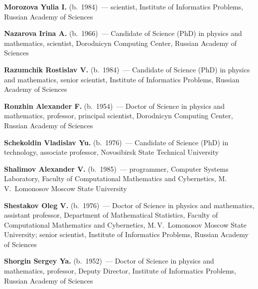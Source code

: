 \begin{multicols}{2}
\vspace*{4pt}

\noindent
\textbf{Morozova Yulia I.} (b.\ 1984)~--- scientist, Institute of Informatics Problems, 
Russian Academy of Sciences

\vspace*{4pt}

\noindent
\textbf{Nazarova Irina A.} (b.\ 1966)~--- Candidate of Science (PhD) in physics and mathematics, 
scientist, Dorodnicyn Computing Center, Russian Academy of Sciences

\vspace*{4pt}

\noindent
\textbf{Razumchik Rostislav V.} (b.\ 1984)~--- Candidate of Science (PhD) in physics 
and mathematics, senior scientist, Institute of Informatics Problems, Russian Academy of Sciences

\vspace*{4pt}

\noindent
\textbf{Ronzhin Alexander F.} (b.\ 1954)~--- Doctor of Science in physics and mathematics, 
professor,  principal scientist, Dorodnicyn Computing Center, Russian Academy of Sciences 

\vspace*{4pt}

\noindent
\textbf{Schekoldin Vladislav Yu.} (b.\ 1976)~--- Candidate of Science (PhD) in technology, 
associate professor,  Novosibirsk State Technical University 

\vspace*{4pt}

\noindent
\textbf{Shalimov Alexander V.} (b.\ 1985)~--- programmer, Computer Systems Laboratory, 
Faculty of Computational Mathematics 
and Cybernetics, M.\,V.~Lomonosov Moscow State University 

\vspace*{4pt}


\noindent
\textbf{Shestakov Oleg V.} (b.\ 1976)~--- Doctor of Science in physics and 
mathematics, assistant professor, Department of Mathematical Statistics, Faculty of 
Computational Mathematics and Cybernetics, M.\,V.~Lomonosov Moscow State University; 
senior scientist, Institute of Informatics Problems, Russian Academy of Sciences 

\vspace*{4pt}

\noindent
\textbf{Shorgin Sergey Ya.} (b.\ 1952)~--- Doctor of Science in physics and mathematics, 
professor, Deputy Director, Institute of Informatics Problems, Russian Academy of Sciences


\end{multicols}
